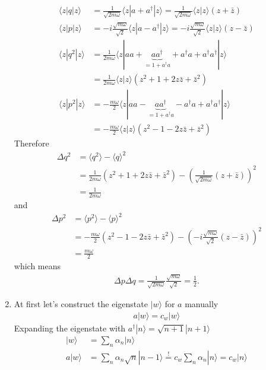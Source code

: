 \documentclass[10pt,a4paper]{article}
\theoremstyle{definition}
\begin{document}
\begin{enumerate}
\begin{align}
    \langle z|q|z\rangle
    &=\frac{1}{\sqrt{2m\omega}}\langle z|a+a^\dagger|z\rangle
    =\frac{1}{\sqrt{2m\omega}}\langle z|z\rangle(z+\bar{z})\\
    \langle z|p|z\rangle&=-i\frac{\sqrt{m\omega}}{\sqrt{2}}\langle z|a-a^\dagger|z\rangle=
    -i\frac{\sqrt{m\omega}}{\sqrt{2}}\langle z|z\rangle(z-\bar{z})\\
    \langle z|q^2|z\rangle
    &=\frac{1}{2m\omega}\langle z|aa+\underbrace{aa^\dagger}_{=1+a^\dagger a}+a^\dagger a+a^\dagger a^\dagger|z\rangle\\
    &=\frac{1}{2m\omega}\langle z|z\rangle\left(z^2+1+2z\bar{z}+\bar{z}^2\right)\\
    \langle z|p^2|z\rangle
    &=-\frac{m\omega}{2}\langle z|aa-\underbrace{aa^\dagger}_{=1+a^\dagger a}-a^\dagger a+a^\dagger a^\dagger|z\rangle\\
    &=-\frac{m\omega}{2}\langle z|z\rangle\left(z^2-1-2z\bar{z}+\bar{z}^2\right)
\end{align}
Therefore
\begin{align}
    \Delta q^2
    &=\langle q^2\rangle-\langle q\rangle^2\\
    &=\frac{1}{2m\omega}\left(z^2+1+2z\bar{z}+\bar{z}^2\right)-\left(\frac{1}{\sqrt{2m\omega}}(z+\bar{z})\right)^2\\
    &=\frac{1}{2m\omega}
\end{align}
and
\begin{align}
    \Delta p^2
    &=\langle p^2\rangle-\langle p\rangle^2\\
    &=-\frac{m\omega}{2}\left(z^2-1-2z\bar{z}+\bar{z}^2\right)-\left(-i\frac{\sqrt{m\omega}}{\sqrt{2}}(z-\bar{z})\right)^2\\
    &=\frac{m\omega}{2}
\end{align}
which means
\begin{align}
    \Delta p\Delta q=\frac{1}{\sqrt{2m\omega}}\frac{\sqrt{m\omega}}{\sqrt{2}}=\frac{1}{2}.
\end{align}
\item At first let's construct the eigenstate $|w\rangle$ for $a$ manually
\begin{align}
    a|w\rangle=c_w|w\rangle
\end{align}
Expanding the eigenstate with $a^\dagger|n\rangle=\sqrt{n+1}|n+1\rangle$
\begin{align}
    |w\rangle
    &=\sum_n\alpha_n|n\rangle\\
    a|w\rangle
    &=\sum_n\alpha_n\sqrt{n}|n-1\rangle\overset{!}{=}c_w\sum_n\alpha_n|n\rangle=c_w|n\rangle\\

\end{align}
\end{enumerate}
\end{document}
